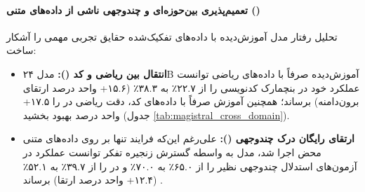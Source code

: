 \paragraph*{تعمیم‌پذیری بین‌حوزه‌ای و چندوجهی ناشی از داده‌های متنی ()}
تحلیل رفتار مدل آموزش‌دیده با داده‌های تفکیک‌شده حقایق تجربی مهمی را آشکار ساخت:
\begin{itemize}
    \item \textbf{انتقال بین ریاضی و کد ():} مدل ۲۴B آموزش‌دیده صرفاً با داده‌های ریاضی توانست عملکرد خود در بنچمارک کدنویسی  را از ۲۲.۷٪ به ۳۸.۳٪ (۱۵.۶+ واحد درصد ارتقای برون‌دامنه) برساند؛ همچنین آموزش صرفاً با داده‌های کد، دقت ریاضی در  را ۱۷.۵+ واحد درصد بهبود بخشید (جدول \ref{tab:magistral_cross_domain}).
    \item \textbf{ارتقای رایگان درک چندوجهی ():} علی‌رغم این‌که فرایند  تنها بر روی داده‌های متنی محض اجرا شد، مدل به واسطه گسترش زنجیره تفکر توانست عملکرد در آزمون‌های استدلال چندوجهی نظیر  را از ۶۵.۰٪ به ۷۰.۰٪ و در  را از ۳۹.۷٪ به ۵۲.۱٪ (۱۲.۴+ واحد درصد ارتقا) برساند \cite{yue2024mmmu, yue2025mmmupro}.
\end{itemize}

\begin{table}[htbp]
\centering
\caption{تعمیم‌پذیری بین‌حوزه‌ای در آموزش‌های تک‌دامنه‌ای مدل }
\label{tab:magistral_cross_domain}
\end{table}

